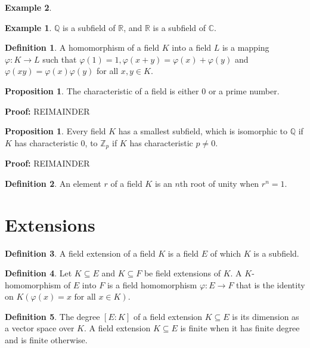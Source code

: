 \documentclass[11pt]{amsbook}%
\theoremstyle{plain}
\theoremstyle{definition}
\newtheorem{definition*}{Definition}
\newtheorem*{example*}{Example}
\newtheorem{proposition}[theorem]{Proposition}
\numberwithin{equation}{section}
\newcommand{\CC}{\mathbb C}
\newcommand{\QQ}{\mathbb Q}
\newcommand{\RR}{\mathbb R}
\newcommand{\ZZ}{\mathbb Z}
\renewcommand{\proof}{ \textbf{Proof: }}
\begin{document}
\begin{example*}
\begin{example*}
  $\QQ$ is a subfield of $\RR$, and $\RR$ is a subfield of $\CC$.
\end{example*}

\begin{definition*}
  A homomorphism of a field $K$ into a field $L$ is a mapping $\varphi: K \longrightarrow L$
  such that $\varphi(1) = 1, \varphi(x+y) = \varphi(x) + \varphi(y)$ and
  $\varphi(xy) = \varphi(x)\varphi(y)$ for all $x, y \in K$.
\end{definition*}

\begin{proposition}
  The characteristic of a field is either 0 or a prime number.
\end{proposition} \vspace{1.8em}
\proof REIMAINDER

\begin{proposition}
  Every field $K$  has a smallest subfield, which is isomorphic to $\QQ$
  if $K$ has characteristic 0, to $\ZZ_{p}$ if $K$ has characteristic $p \neq 0$.
\end{proposition} \vspace{1.8em}
\proof REIMAINDER

\begin{definition*}
  An element $r$ of a field $K$ is an $n$th root of unity when $r^{n} = 1$.
\end{definition*}

\section{Extensions}

\begin{definition*}
  \label{def-extension-field}
  A field extension of a field $K$ is a field $E$ of which $K$ is a subfield.
\end{definition*}

\begin{definition*}
  \label{def-k-homomorphism}
  Let $K \subseteq E$ and $K \subseteq F$ be field extensions of $K$. A $K$-homomorphism of $E$ into $F$
  is a field homomorphism $\varphi: E \longrightarrow F$ that is the identity
  on $K(\varphi(x) = x \text{ for all } x \in K)$.
\end{definition*}

\begin{definition*}
  The degree $[E:K]$ of a field extension $K \subseteq E$ is its dimension
  as a vector space over $K$. A field extension $K \subseteq E$ is finite when
  it has finite degree and is finite otherwise.
\end{definition*}


\end{example*}
\end{document}
